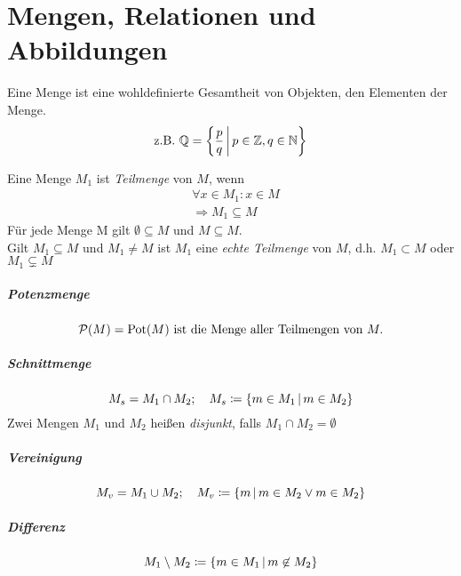 \chapter{Mengen, Relationen und Abbildungen}

Eine Menge ist eine wohldefinierte Gesamtheit von Objekten, den Elementen der Menge.
\begin{equation*}
  \text{z.B. }\mathbb{Q}=\left\{ \frac{p}{q} \,\middle|\, p\in\mathbb{Z}, q\in\mathbb{N} \right\}
\end{equation*}

Eine Menge $M_1$ ist \emph{Teilmenge} von $M$, wenn
\begin{align*}
  &\forall x\in M_1 : x\in M\\
  &\Rightarrow M_1 \subseteq M
\end{align*}
Für jede Menge M gilt $\emptyset \subseteq M$ und $M\subseteq M$.\\
Gilt $M_1\subseteq M$ und $M_1\neq M$ ist $M_1$ eine \emph{echte Teilmenge} von $M$, d.h. $M_1 \subset M$ oder $M_1\subsetneq M$

\paragraph{Potenzmenge}
\begin{equation*}
  \mathcal{P}(M)=\mathrm{Pot}(M) \text{ ist die Menge aller Teilmengen von } M.
\end{equation*}
\paragraph{Schnittmenge}
\begin{equation*}
  M_s = M_1 \cap M_2; \quad M_s \coloneqq \left\{ m\in M_1 \,\middle|\, m\in M_2 \right\}
\end{equation*}
Zwei Mengen $M_1$ und $M_2$ heißen \emph{disjunkt}, falls $M_1\cap M_2 = \emptyset$
\paragraph{Vereinigung}
\begin{equation*}
  M_v = M_1 \cup M_2; \quad M_v \coloneqq \left\{ m \,\middle|\, m\in M_2 \vee m\in M_2 \right\}
\end{equation*}
\paragraph{Differenz}
\begin{equation*}
  M_1\setminus M_2 \coloneqq \left\{ m\in M_1 \,\middle|\, m\not\in M_2 \right\}
\end{equation*}
